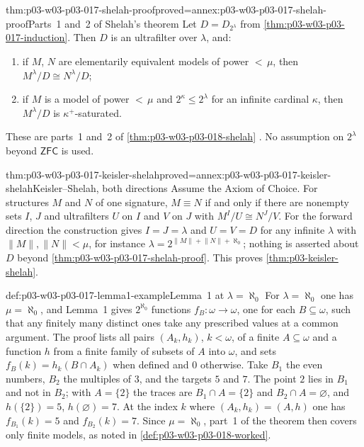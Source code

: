 \begin{hbtheorem}{thm:p03-w03-p03-017-shelah-proof}{proved=annex:p03-w03-p03-017-shelah-proof}{Parts~1 and~2 of Shelah's theorem}
Let \(D=D_{2^\lambda}\) from \cref{thm:p03-w03-p03-017-induction}.  Then
\(D\) is an ultrafilter over \(\lambda\), and:
\begin{enumerate}
  \item if \(M\), \(N\) are elementarily equivalent models of power
        \({<}\,\mu\), then \(M^\lambda/D\cong N^\lambda/D\);
  \item if \(M\) is a model of power \({<}\,\mu\) and \(2^\kappa\le2^\lambda\)
        for an infinite cardinal \(\kappa\), then \(M^\lambda/D\) is
        \(\kappa^+\)-saturated.
\end{enumerate}
These are parts~1 and~2 of \cref{thm:p03-w03-p03-018-shelah}
\cite[pp.~231--232]{Shelah1971Ultrapowers}.  No assumption on \(2^\lambda\)
beyond \(\mathsf{ZFC}\) is used.
\end{hbtheorem}

\begin{hbtheorem}{thm:p03-w03-p03-017-keisler-shelah}{proved=annex:p03-w03-p03-017-keisler-shelah}{Keisler--Shelah, both directions}
Assume the Axiom of Choice.  For structures \(M\) and \(N\) of one
signature, \(M\equiv N\) if and only if there are nonempty sets \(I\), \(J\)
and ultrafilters \(U\) on \(I\) and \(V\) on \(J\) with
\(M^I/U\cong N^J/V\).  For the forward direction the construction gives
\(I=J=\lambda\) and \(U=V=D\) for any infinite \(\lambda\) with
\(\lVert M\rVert,\lVert N\rVert<\mu\), for instance
\(\lambda=2^{\lVert M\rVert+\lVert N\rVert+\aleph_0}\); nothing is asserted
about \(D\) beyond \cref{thm:p03-w03-p03-017-shelah-proof}.  This proves
\cref{thm:p03-keisler-shelah}.
\end{hbtheorem}

\begin{hbexample}{def:p03-w03-p03-017-lemma1-example}{Lemma~1 at \(\lambda=\aleph_0\)}
For \(\lambda=\aleph_0\) one has \(\mu=\aleph_0\), and Lemma~1 gives
\(2^{\aleph_0}\) functions \(f_B:\omega\to\omega\), one for each
\(B\subseteq\omega\), such that any finitely many distinct ones take any
prescribed values at a common argument.  The proof lists all pairs
\((A_k,h_k)\), \(k<\omega\), of a finite \(A\subseteq\omega\) and a function
\(h\) from a finite family of subsets of \(A\) into \(\omega\), and sets
\(f_B(k)=h_k(B\cap A_k)\) when defined and \(0\) otherwise.  Take \(B_1\) the
even numbers, \(B_2\) the multiples of \(3\), and the targets \(5\) and
\(7\).  The point \(2\) lies in \(B_1\) and not in \(B_2\); with
\(A=\{2\}\) the traces are \(B_1\cap A=\{2\}\) and \(B_2\cap A=\varnothing\),
and \(h(\{2\})=5\), \(h(\varnothing)=7\).  At the index \(k\) where
\((A_k,h_k)=(A,h)\) one has \(f_{B_1}(k)=5\) and \(f_{B_2}(k)=7\).  Since
\(\mu=\aleph_0\), part~1 of the theorem then covers only finite models,
as noted in \cref{def:p03-w03-p03-018-worked}.
\end{hbexample}

